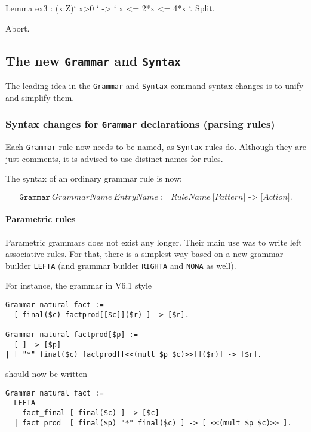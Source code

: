 \documentclass[11pt]{article}
\begin{document}
\begin{coq_example*}
\begin{coq_example}
Lemma ex3 : (x:Z)` x>0 ` -> ` x <= 2*x <= 4*x `.
Split.
\end{coq_example}
\begin{coq_eval}
Abort.
\end{coq_eval}
\subsection{The new \texttt{Grammar} and \texttt{Syntax}}
\label{parsing-printing}

The leading idea in the {\tt Grammar} and {\tt Syntax} command syntax
changes is to unify and simplify them.

\subsubsection{Syntax changes for \texttt{Grammar} declarations (parsing rules)}

Each \texttt{Grammar} rule now needs to be named, as \texttt{Syntax}
rules do. Although they are just comments, it is advised to use distinct
names for rules.

The syntax of an ordinary grammar rule is now:

\[
\texttt{Grammar}~\textit{GrammarName}~\textit{EntryName}~\texttt{:=}~
 \textit{RuleName}~ \texttt{[} \textit{Pattern}  \texttt{] -> [} \textit{Action}
\texttt{]}.
\]
\paragraph{Parametric rules}

Parametric grammars does not exist any longer. Their main use was to
write left associative rules. For that, there is a simplest way based
on a new grammar builder \texttt{LEFTA} (and grammar builder
\texttt{RIGHTA} and \texttt{NONA} as well).

For instance, the grammar in V6.1 style

\begin{verbatim}
Grammar natural fact :=
  [ final($c) factprod[[$c]]($r) ] -> [$r].

Grammar natural factprod[$p] :=
  [ ] -> [$p]
| [ "*" final($c) factprod[[<<(mult $p $c)>>]]($r)] -> [$r].
\end{verbatim}
should now be written
\begin{verbatim}
Grammar natural fact :=
  LEFTA
    fact_final [ final($c) ] -> [$c]
  | fact_prod  [ final($p) "*" final($c) ] -> [ <<(mult $p $c)>> ].
\end{verbatim}


\end{coq_example*}
\end{document}
